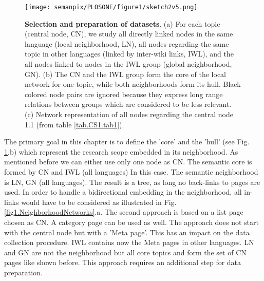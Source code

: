 \documentclass[a4paper,10pt]{scrbook}
\begin{document}
\begin{figure}[th!]
\begin{center} \texttt{[image: semanpix/PLOSONE/figure1/sketch2v5.png]} \end{center}
   \caption[\textbf{Selection and preparation of datasets}. (a) For each topic (central node, CN), we study all directly linked nodes in the same language (local neighborhood, LN), all nodes regarding the same topic in other languages (linked by inter-wiki links, IWL), and the all nodes linked to nodes in the IWL group (global neighborhood, GN). (b) The CN and the IWL group form the core of the local network for one topic, while both neighborhoods form its hull. Black colored node pairs are ignored because they express long range relations between groups which are considered to be less relevant.  (c) Network representation of all nodes regarding the central node 1.1 (from table \ref{tab.CS1.tab1}).]{\textbf{Selection and preparation of datasets}. (a) For each topic (central node, CN), we study all directly linked nodes in the same language (local neighborhood, LN), all nodes regarding the same topic in other languages (linked by inter-wiki links, IWL), and the all nodes linked to nodes in the IWL group (global neighborhood, GN). (b) The CN and the IWL group form the core of the local network for one topic, while both neighborhoods form its hull. Black colored node pairs are ignored because they express long range relations between groups which are considered to be less relevant.  (c) Network representation of all nodes regarding the central node 1.1 (from table \ref{tab.CS1.tab1}).}
\label{fig.PLOSONE}
\end{figure}

The primary goal in this chapter is to define the 'core' and the 'hull' (see Fig. \ref{fig.PLOSONE}.b) which represent the research scope embedded in its neighborhood. As mentioned before we can either use only one node as CN. The semantic core is formed by CN and IWL (all languages) In this case. The semantic neighborhood is LN, GN (all languages). The result is a tree, as long no back-links to pages are used. In order to handle a bidirectional embedding in the neighborhood, all in-links would have to be considered as illustrated in Fig. \ref{fig1.NeighborhoodNetworks}.a. The second approach is based on a list page chosen as CN. A category page can be used as well. The approach does not start with the central node but with a 'Meta page'. This has an impact on the data collection procedure. IWL contains now the Meta pages in other languages. LN and GN are not the neighborhood but all core topics and form the set of CN pages like shown before. This approach requires an additional step for data preparation.\\
\end{document}
